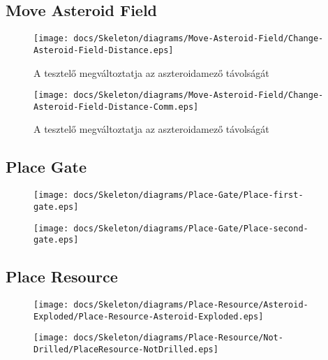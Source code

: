 \subsection{Move Asteroid Field}

\begin{figure}[H] 
    \centering 
    \texttt{[image: docs/Skeleton/diagrams/Move-Asteroid-Field/Change-Asteroid-Field-Distance.eps]} 
    \caption{A tesztelő megváltoztatja az aszteroidamező távolságát} 
\end{figure}

\begin{figure}[H] 
    \centering 
    \texttt{[image: docs/Skeleton/diagrams/Move-Asteroid-Field/Change-Asteroid-Field-Distance-Comm.eps]} 
    \caption{A tesztelő megváltoztatja az aszteroidamező távolságát} 
\end{figure}

\subsection{Place Gate}

\begin{figure}[H] 
    \centering 
    \texttt{[image: docs/Skeleton/diagrams/Place-Gate/Place-first-gate.eps]} 
    \caption{} 
\end{figure} 

\begin{figure}[H] 
    \centering 
    \texttt{[image: docs/Skeleton/diagrams/Place-Gate/Place-second-gate.eps]} 
    \caption{} 
\end{figure} 



\subsection{Place Resource}

\begin{figure}[H] 
    \centering 
    \texttt{[image: docs/Skeleton/diagrams/Place-Resource/Asteroid-Exploded/Place-Resource-Asteroid-Exploded.eps]} 
    \caption{} 
\end{figure} 

\begin{figure}[H] 
    \centering 
    \texttt{[image: docs/Skeleton/diagrams/Place-Resource/Not-Drilled/PlaceResource-NotDrilled.eps]} 
    \caption{} 
\end{figure} 